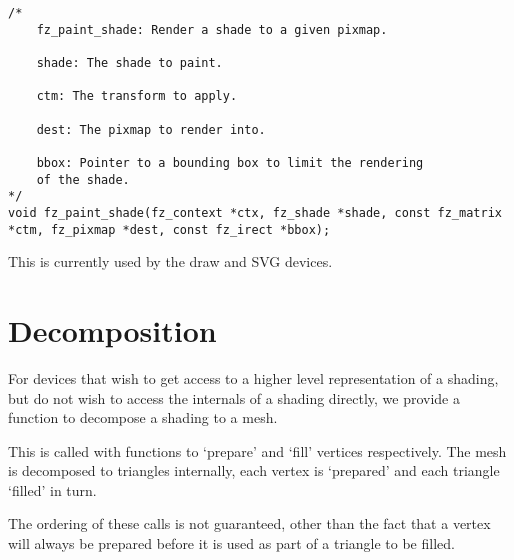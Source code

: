 \documentclass[oneside]{book}
\begin{document}
\begin{lstlisting}
/*
	fz_paint_shade: Render a shade to a given pixmap.

	shade: The shade to paint.

	ctm: The transform to apply.

	dest: The pixmap to render into.

	bbox: Pointer to a bounding box to limit the rendering
	of the shade.
*/
void fz_paint_shade(fz_context *ctx, fz_shade *shade, const fz_matrix *ctm, fz_pixmap *dest, const fz_irect *bbox);
\end{lstlisting}

This is currently used by the draw and SVG devices.

\section{Decomposition}

For devices that wish to get access to a higher level representation of a shading, but do not wish to access the internals of a shading directly, we provide a function to decompose a shading to a mesh.

This is called with functions to `prepare' and `fill' vertices respectively. The mesh is decomposed to triangles internally,
each vertex is `prepared' and each triangle `filled' in turn.

The ordering of these calls is not guaranteed, other than the fact that a vertex will always be prepared before it is used as part of a triangle to be filled.
\end{document}
